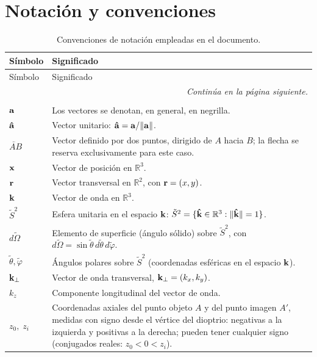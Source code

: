 \chapter*{Notación y convenciones}

\begin{longtable}{p{} p{}}
\caption{Convenciones de notación empleadas en el documento.}
\label{tab:notation_conventions}\\
\hline
Símbolo & Significado \\
\hline
\endfirsthead
\hline
Símbolo & Significado \\
\hline
\endhead
\hline
\multicolumn{2}{r}{\textit{Continúa en la página siguiente.}} \\
\endfoot
\hline
\endlastfoot
\multicolumn{2}{l}{\textit{Vectores y coordenadas}} \\
\hline
$\vb a$ & Los vectores se denotan, en general, en negrilla. \\
$\bm{\hat{\mathbf{a}}}$ & Vector unitario: $\bm{\hat{\mathbf{a}}}=\vb a/\lVert\vb a\rVert$. \\
$\lvec{AB}$ & Vector definido por dos puntos, dirigido de $A$ hacia $B$; la flecha se reserva exclusivamente para este caso. \\
$\vb x$ & Vector de posición en $\mathbb{R}^3$. \\
$\vb r$ & Vector transversal en $\mathbb{R}^2$, con $\vb r=(x,y)$. \\
$\vb k$ & Vector de onda en $\mathbb{R}^3$. \\
$\tilde S^2$ & Esfera unitaria en el espacio $\vb k$: $\tilde S^2=\{\bm{\hat{\mathbf{k}}}\in\mathbb R^3:\|\bm{\hat{\mathbf{k}}}\|=1\}$. \\
$d\tilde\Omega$ & Elemento de superficie (ángulo sólido) sobre $\tilde S^2$, con $d\tilde\Omega=\sin\tilde\theta\,d\tilde\theta\,d\tilde\varphi$. \\
$\tilde\theta,\tilde\varphi$ & Ángulos polares sobre $\tilde S^2$ (coordenadas esféricas en el espacio $\vb k$). \\
$\vb k_\perp$ & Vector de onda transversal, $\vb k_\perp=(k_x,k_y)$. \\
$k_z$ & Componente longitudinal del vector de onda. \\
$z_0,\;z_i$ & Coordenadas axiales del punto objeto $A$ y del punto imagen $A'$, medidas con signo desde el vértice del dioptrio: negativas a la izquierda y positivas a la derecha; pueden tener cualquier signo (conjugados reales: $z_0<0<z_i$). \\

\end{longtable}
